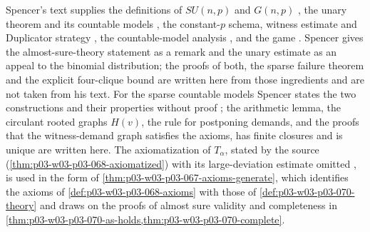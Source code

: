 Spencer's text supplies the definitions of \(SU(n,p)\) and \(G(n,p)\)
\cite[pp.~1, 4]{Spencer2007LogicRandomStructuresAuthor}, the unary theorem
and its countable models \cite[pp.~3--4]{Spencer2007LogicRandomStructuresAuthor},
the constant-\(p\) schema, witness estimate and Duplicator strategy
\cite[pp.~12--13]{Spencer2007LogicRandomStructuresAuthor}, the countable-model
analysis \cite[pp.~13--15]{Spencer2007LogicRandomStructuresAuthor}, and the
game \cite[pp.~26--27]{Spencer2007LogicRandomStructuresAuthor}.  Spencer
gives the almost-sure-theory statement as a remark and the unary estimate as
an appeal to the binomial distribution; the proofs of both, the sparse
failure theorem and the explicit four-clique bound are written here from
those ingredients and are not taken from his text.  For the sparse countable
models Spencer states the two constructions and their properties without
proof \cite[pp.~14--15]{Spencer2007LogicRandomStructuresAuthor}; the
arithmetic lemma, the circulant rooted graphs \(H(v)\), the rule for
postponing demands, and the proofs that the witness-demand graph satisfies
the axioms, has finite closures and is unique are written here.  The
axiomatization of \(T_\alpha\), stated by the source
(\cref{thm:p03-w03-p03-068-axiomatized}) with its large-deviation estimate
omitted \cite[pp.~10--11]{Spencer2007LogicRandomStructuresAuthor}, is used
in the form of \cref{thm:p03-w03-p03-067-axioms-generate}, which identifies
the axioms of \cref{def:p03-w03-p03-068-axioms} with those of
\cref{def:p03-w03-p03-070-theory} and draws on the proofs of almost sure
validity and completeness in
\cref{thm:p03-w03-p03-070-as-holds,thm:p03-w03-p03-070-complete}.
